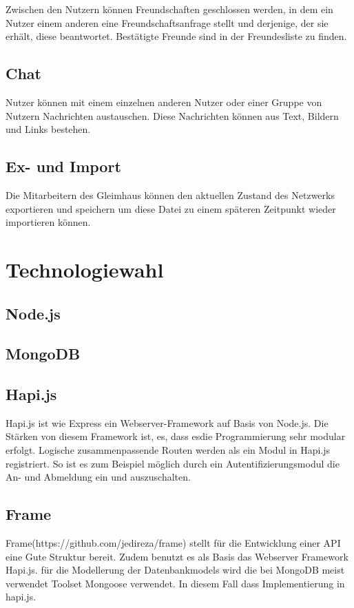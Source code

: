 \documentclass[12pt]{article} %
\begin{document}
Zwischen den Nutzern können Freundschaften geschlossen werden, in dem ein Nutzer einem anderen eine Freundschaftsanfrage stellt und derjenige, der sie erhält, diese beantwortet. Bestätigte Freunde sind in der Freundesliste zu finden.

\subsection{Chat}
Nutzer können mit einem einzelnen anderen Nutzer oder einer Gruppe von Nutzern Nachrichten austauschen. Diese Nachrichten können aus Text, Bildern und Links bestehen.

\subsection{Ex- und Import}
Die Mitarbeitern des Gleimhaus können den aktuellen Zustand des Netzwerks exportieren und speichern um diese Datei zu einem späteren Zeitpunkt wieder importieren können.

\section{Technologiewahl}
\subsection{Node.js}
\subsection{MongoDB}
\subsection{Hapi.js}
Hapi.js ist wie Express ein Webserver-Framework auf Basis von Node.js. Die Stärken von diesem Framework ist, es, dass esdie Programmierung sehr modular erfolgt. Logische zusammenpassende Routen werden als ein Modul in Hapi.js registriert. So ist es zum Beispiel möglich durch ein Autentifizierungsmodul die An- und Abmeldung ein und auszuschalten.
\subsection{Frame}
Frame(https://github.com/jedireza/frame) stellt für die Entwicklung einer API eine Gute Struktur bereit. Zudem benutzt es als Basis das Webserver Framework Hapi.js. für die Modellerung der Datenbankmodels wird die bei MongoDB meist verwendet Toolset Mongoose verwendet. In diesem Fall dass Implementierung in hapi.js.
\end{document}
